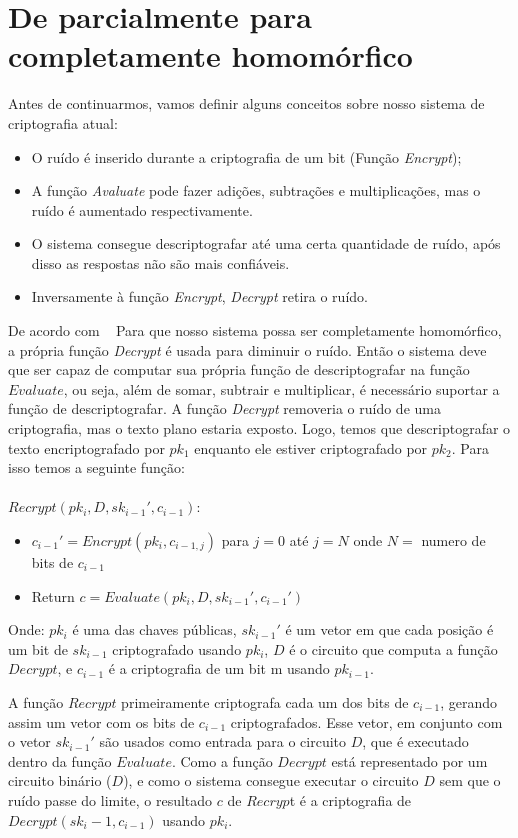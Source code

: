 \section{De parcialmente para completamente homomórfico}
Antes de continuarmos, vamos definir alguns conceitos sobre nosso sistema de criptografia atual:
\begin{itemize}
	\item O ruído é inserido durante a criptografia de um bit (Função \textit{Encrypt});
	\item A função \textit{Avaluate} pode fazer adições, subtrações e multiplicações, mas o ruído é aumentado respectivamente.
	\item O sistema consegue descriptografar até uma certa quantidade de ruído, após disso as respostas não são mais confiáveis.
	\item Inversamente à função \textit{Encrypt}, \textit{Decrypt} retira o ruído.
\end{itemize}
  
De acordo com ~\cite{easyfhe} Para que nosso sistema possa ser completamente homomórfico, a própria função \textit{Decrypt} é usada para diminuir o ruído.
Então o sistema deve que ser capaz de computar sua própria função de descriptografar na função $Evaluate$, ou seja, além de somar, subtrair e multiplicar, é necessário suportar a função de descriptografar.
A função \textit{Decrypt} removeria o ruído de uma criptografia, mas o texto plano estaria exposto. Logo, temos que descriptografar o texto encriptografado por $pk_1$ enquanto ele estiver criptografado por $pk_2$. Para isso temos a seguinte função:
\\\\
$Recrypt(pk_i , D, sk_{i-1}', c_{i-1})$:
\begin{itemize}
	\item $c_{i-1}' = Encrypt(pk_i, c_{i-1,j})$ para $j = 0$ até $j = N$ onde $N =$ numero de bits de $c_{i-1}$
	\item Return $c = Evaluate(pk_i, D, sk_{i-1}', c_{i-1}')$
\end{itemize}
Onde: $pk_i$ é uma das chaves públicas, $sk_{i-1}'$ é um vetor em que cada posição é um bit de $sk_{i-1}$ criptografado usando $pk_i$, $D$ é o circuito que computa a função $Decrypt$, e $c_{i-1}$ é a criptografia de um bit m usando $pk_{i-1}$.
  
A função $Recrypt$ primeiramente criptografa cada um dos bits de $c_{i-1}$, gerando assim um vetor com os bits de $c_{i-1}$ criptografados.
Esse vetor, em conjunto com o vetor $sk_{i-1}'$ são usados como entrada para o circuito $D$, que é executado dentro da função $Evaluate$.
Como a função $Decrypt$ está representado por um circuito binário ($D$), e como o sistema consegue executar o circuito $D$ sem que o ruído passe do limite, o resultado $c$ de $Recryp$t é a criptografia de $Decrypt(sk_i-1, c_{i-1})$ usando $pk_i$.
  
